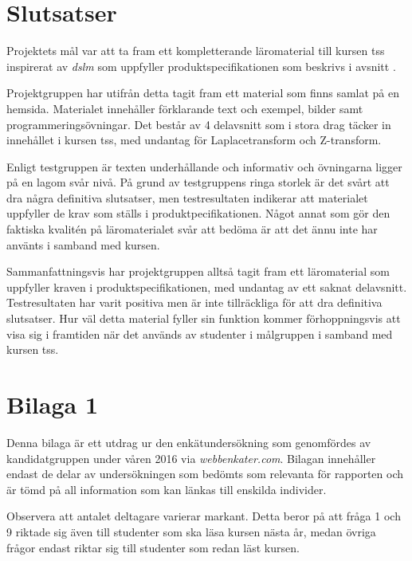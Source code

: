 \documentclass[12pt,a4paper,twoside,openright]{article}
\begin{document}
\newpage

\section{Slutsatser}
Projektets mål var att ta fram ett kompletterande läromaterial till
kursen \gls{tss} inspirerat av \textit{\gls{dslm}} som uppfyller
produktspecifikationen som beskrivs i avsnitt .

Projektgruppen har utifrån detta tagit fram ett material som finns
samlat på en hemsida. Materialet innehåller förklarande text och
exempel, bilder samt programmeringsövningar. Det består av 4
delavsnitt som i stora drag täcker in innehållet i kursen
\gls{tss}, med undantag för Laplacetransform och Z-transform.

Enligt testgruppen är texten underhållande och informativ och
övningarna ligger på en lagom svår nivå. På grund av testgruppens
ringa storlek är det svårt att dra några definitiva slutsatser, men
testresultaten indikerar att materialet uppfyller de krav som ställs i
produktpecifikationen. Något annat som gör den faktiska kvalitén på
läromaterialet svår att bedöma är att det ännu inte har använts i
samband med kursen.

Sammanfattningsvis har projektgruppen alltså tagit fram ett
läromaterial som uppfyller kraven i produktspecifikationen, med
undantag av ett saknat delavsnitt. Testresultaten har varit positiva
men är inte tillräckliga för att dra definitiva slutsatser. Hur väl detta
material fyller sin funktion kommer förhoppningsvis att visa sig i
framtiden när det används av studenter i målgruppen i samband med
kursen \gls{tss}.

\newpage

\setlength{\bibitemsep}{3mm}
\printbibliography

\newpage

\appendix

\section{Bilaga 1}
\label{bil:1}
Denna bilaga är ett utdrag ur den enkätundersökning som genomfördes av
kandidatgruppen under våren 2016 via \textit{webbenkater.com}. Bilagan
innehåller endast de delar av undersökningen som bedömts som relevanta
för rapporten och är tömd på all information som kan länkas till
enskilda individer.

Observera att antalet deltagare varierar markant. Detta beror på att
fråga 1 och 9 riktade sig även till studenter som ska läsa kursen
nästa år, medan övriga frågor endast riktar sig till studenter som
redan läst kursen.
\end{document}
